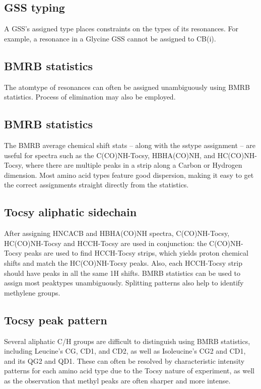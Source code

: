 \subsection*{GSS typing}
A GSS's assigned type places constraints on the types of its resonances.
For example, a resonance in a Glycine GSS cannot be assigned to CB(i).

\subsection*{BMRB statistics}
The atomtype of resonances can often be assigned unambiguously using BMRB
statistics.  Process of elimination may also be employed.

\subsection*{BMRB statistics}
The BMRB average chemical shift stats -- along with the sstype assignment -- 
are useful for spectra such as the C(CO)NH-Tocsy, HBHA(CO)NH, and 
HC(CO)NH-Tocsy, where there are multiple peaks in a strip along a Carbon or
Hydrogen dimension. Most amino acid types feature good dispersion, making it 
easy to get the correct assignments straight directly from the statistics.

\subsection*{Tocsy aliphatic sidechain}
After assigning HNCACB and HBHA(CO)NH spectra, C(CO)NH-Tocsy, HC(CO)NH-Tocsy 
and HCCH-Tocsy are used in conjunction:
the C(CO)NH-Tocsy peaks are used to find HCCH-Tocsy strips, which yields proton 
chemical shifts and match the HC(CO)NH-Tocsy peaks.  Also, each HCCH-Tocsy 
strip should have peaks in all the same 1H shifts.
BMRB statistics can be used to assign most peaktypes unambiguously.  
Splitting patterns also help to identify methylene groups.

\subsection*{Tocsy peak pattern}
Several aliphatic C/H groups are difficult to distinguish using BMRB statistics,
including Leucine's CG, CD1, and CD2, as well as Isoleucine's CG2 and CD1, and
its QG2 and QD1. These can often be resolved by characteristic intensity 
patterns for each amino acid type due to the Tocsy nature of experiment,
as well as the observation that methyl peaks are often sharper and more intense.

